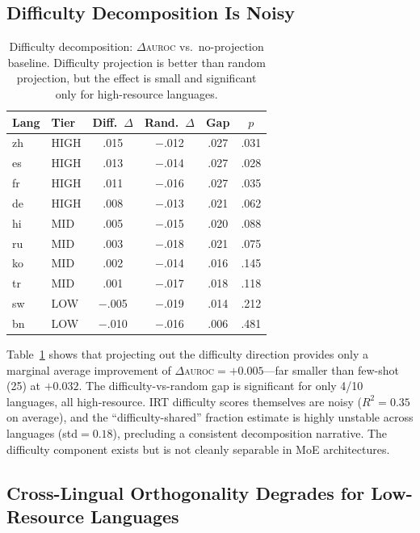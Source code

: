 \documentclass[11pt,a4paper]{article}
\newcommand{\auroc}{\textsc{auroc}}
\begin{document}
\subsection{Difficulty Decomposition Is Noisy}
\label{sec:decomp-results}

\begin{table}[t]
\centering
\small
\begin{tabular}{llcccc}
\toprule
\textbf{Lang} & \textbf{Tier} & \textbf{Diff.\ $\Delta$} & \textbf{Rand.\ $\Delta$} & \textbf{Gap} & $p$ \\
\midrule
zh & HIGH & .015 & $-$.012 & .027 & .031 \\
es & HIGH & .013 & $-$.014 & .027 & .028 \\
fr & HIGH & .011 & $-$.016 & .027 & .035 \\
de & HIGH & .008 & $-$.013 & .021 & .062 \\
hi & MID & .005 & $-$.015 & .020 & .088 \\
ru & MID & .003 & $-$.018 & .021 & .075 \\
ko & MID & .002 & $-$.014 & .016 & .145 \\
tr & MID & .001 & $-$.017 & .018 & .118 \\
sw & LOW & $-$.005 & $-$.019 & .014 & .212 \\
bn & LOW & $-$.010 & $-$.016 & .006 & .481 \\
\bottomrule
\end{tabular}
\caption{Difficulty decomposition: $\Delta$\auroc{} vs.\ no-projection baseline. Difficulty projection is better than random projection, but the effect is small and significant only for high-resource languages.}
\label{tab:decomp}
\end{table}

Table~\ref{tab:decomp} shows that projecting out the difficulty direction provides only a marginal average improvement of $\Delta$\auroc{}$=+0.005$---far smaller than few-shot (25) at $+0.032$.
The difficulty-vs-random gap is significant for only 4/10 languages, all high-resource.
IRT difficulty scores themselves are noisy ($R^2=0.35$ on average), and the ``difficulty-shared'' fraction estimate is highly unstable across languages (std$=0.18$), precluding a consistent decomposition narrative.
The difficulty component exists but is not cleanly separable in MoE architectures.

\subsection{Cross-Lingual Orthogonality Degrades for Low-Resource Languages}
\label{sec:ortho-results}
\end{document}
